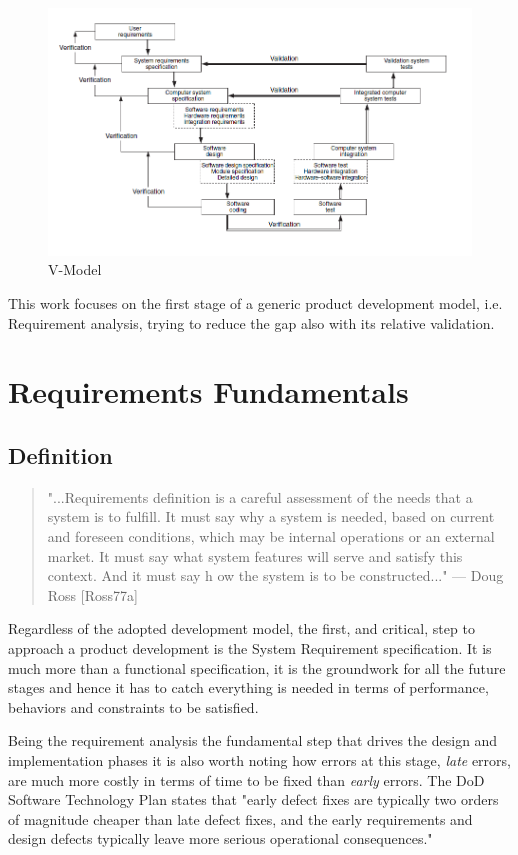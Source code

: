 \begin{figure}[!h]
	\centering 
     \includegraphics[width=\textwidth]{Figs/vmodel.png} 
     \caption{V-Model} 
     \label{fig:vmodel} 
\end{figure} 

This work focuses on the first stage of a generic product development model, i.e. Requirement analysis, trying to reduce the gap also with its relative validation.

\section{Requirements Fundamentals}
\subsection{Definition}
\begin{quote}
"...Requirements definition is a careful assessment of the needs that a system is to fulfill. It must say why a
system is needed, based on current and foreseen conditions, which may be internal operations or an external market. It must say what system features will serve and satisfy this context. And it must say h ow the
system is to be constructed..." — Doug Ross [Ross77a]
\end{quote}
Regardless of the adopted development model, the first, and critical, step to approach a product development is the System Requirement specification. It is much more than a functional specification, it is the groundwork for all the future stages and hence it has to catch everything is needed in terms of performance, behaviors and constraints to be satisfied. 
\par Being the requirement analysis the fundamental step that drives the design and implementation phases it is also worth noting how errors at this stage, \textit{late} errors, are much more costly in terms of time to be fixed than \textit{early} errors. The DoD Software Technology Plan \citep{DoD91} states that "early defect fixes are typically two orders of magnitude cheaper than late defect fixes, and the early requirements and design defects typically leave more serious operational consequences."

